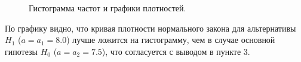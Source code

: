 \documentclass[14pt,a4paper]{scrartcl}
\begin{document}
\begin{figure}[h]
	\caption{Гистограмма частот и графики плотностей.}
	\label{ris:hist_densts}
\end{figure}

По графику видно, что кривая плотности нормального закона для альтернативы $H_1$ ($a=a_1=8.0$) лучше ложится на гистограмму, чем в случае основной гипотезы $H_0$ ($a=a_2=7.5$), что согласуется с выводом в пункте 3.
\end{document}
